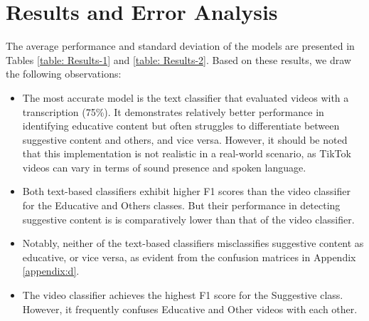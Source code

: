 \documentclass[11pt]{article}
\begin{document}
\begin{table}
\centering
\begin{small}
\end{small}
\caption{\label{table: Results-2} We present the overall F1 of each class label with the average and standard deviation of three random runs. Text-based classification gives a higher F1 for educative content when transcription is present, but suggestive content is detected best in videos where educative content is misclassified higher.}
\end{table}

\section{Results and Error Analysis}
\label{Discussion}

The average performance and standard deviation of the models are presented in Tables \ref{table: Results-1} and \ref{table: Results-2}. Based on these results, we draw the following observations:

\begin{itemize}
    \item The most accurate model is the text classifier that evaluated videos with a transcription (75\%). It demonstrates relatively better performance in identifying educative content but often struggles to differentiate between suggestive content and others, and vice versa. However, it should be noted that this implementation is not realistic in a real-world scenario, as TikTok videos can vary in terms of sound presence and spoken language.
    \item Both text-based classifiers exhibit higher F1 scores than the video classifier for the Educative and Others classes. But their performance in detecting suggestive content is is comparatively lower than that of the video classifier.
    \item Notably, neither of the text-based classifiers misclassifies suggestive content as educative, or vice versa, as evident from the confusion matrices in Appendix \ref{appendix:d}. 
    \item The video classifier achieves the highest F1 score for the Suggestive class. However, it frequently confuses Educative and Other videos with each other.
\end{itemize}
\end{document}
